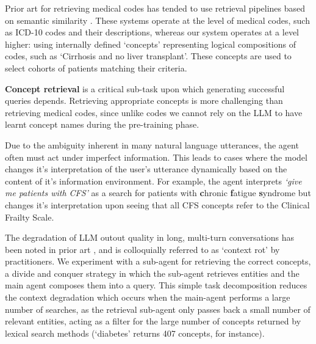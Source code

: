 \documentclass[11pt]{article}
\begin{document}
Prior art for retrieving medical codes has tended to use retrieval pipelines based on semantic similarity \citet{baksi_medcoder_2024, ziletti_retrieval_2024}.
These systems operate at the level of medical codes, such as ICD-10 codes and their descriptions, whereas our system operates at a level higher: using internally defined `concepts' representing logical compositions of codes, such as `Cirrhosis and no liver transplant'.
These concepts are used to select cohorts of patients matching their criteria.

\textbf{Concept retrieval} is a critical sub-task upon which generating successful queries depends.
Retrieving appropriate concepts is more challenging than retrieving medical codes, since unlike codes we cannot rely on the LLM to have learnt concept names during the pre-training phase.

Due to the ambiguity inherent in many natural language utterances, the agent often must act under imperfect information.
This leads to cases where the model changes it's interpretation of the user's utterance dynamically based on the content of it's information environment.
For example, the agent interprets \textit{`give me patients with CFS'} as a search for patients with \textbf{c}hronic \textbf{f}atigue \textbf{s}yndrome but changes it's interpretation upon seeing that all CFS concepts refer to the Clinical Frailty Scale. 


The degradation of LLM outout quality in long, multi-turn conversations has been noted in prior art \cite{laban_llms_2025}, and is colloquially referred to as `context rot' by practitioners.
We experiment with a sub-agent for retrieving the correct concepts, a divide and conquer strategy in which the sub-agent retrieves entities and the main agent composes them into a query.
This simple task decomposition reduces the context degradation which occurs when the main-agent performs a large number of searches, as the retrieval sub-agent only passes back a small number of relevant entities, acting as a filter for the large number of concepts returned by lexical search methods (`diabetes' returns 407 concepts, for instance).

\end{document}
